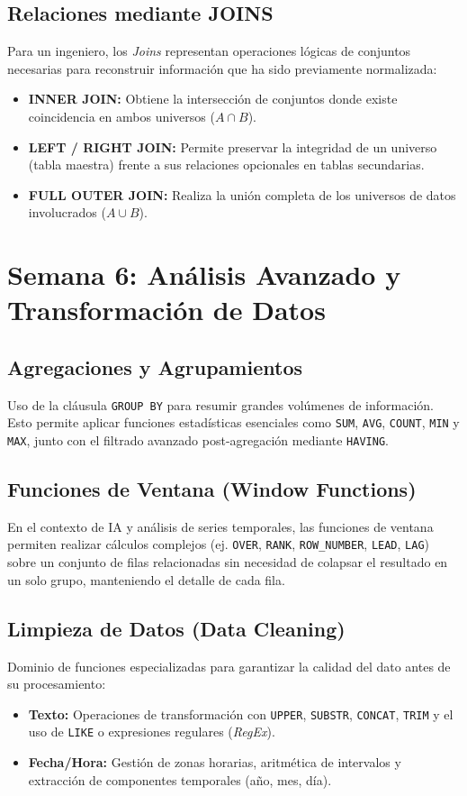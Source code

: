 \documentclass[12pt,a4paper,openany,oneside]{book}
\begin{document}
\subsection{Relaciones mediante JOINS}
Para un ingeniero, los \textit{Joins} representan operaciones lógicas de conjuntos necesarias para reconstruir información que ha sido previamente normalizada:
\begin{itemize}
    \item \textbf{INNER JOIN:} Obtiene la intersección de conjuntos donde existe coincidencia en ambos universos ($A \cap B$).
    \item \textbf{LEFT / RIGHT JOIN:} Permite preservar la integridad de un universo (tabla maestra) frente a sus relaciones opcionales en tablas secundarias.
    \item \textbf{FULL OUTER JOIN:} Realiza la unión completa de los universos de datos involucrados ($A \cup B$).
\end{itemize}



\section{Semana 6: Análisis Avanzado y Transformación de Datos}

\subsection{Agregaciones y Agrupamientos}
Uso de la cláusula \texttt{GROUP BY} para resumir grandes volúmenes de información. Esto permite aplicar funciones estadísticas esenciales como \texttt{SUM}, \texttt{AVG}, \texttt{COUNT}, \texttt{MIN} y \texttt{MAX}, junto con el filtrado avanzado post-agregación mediante \texttt{HAVING}.

\subsection{Funciones de Ventana (Window Functions)}
En el contexto de IA y análisis de series temporales, las funciones de ventana permiten realizar cálculos complejos (ej. \texttt{OVER}, \texttt{RANK}, \texttt{ROW\_NUMBER}, \texttt{LEAD}, \texttt{LAG}) sobre un conjunto de filas relacionadas sin necesidad de colapsar el resultado en un solo grupo, manteniendo el detalle de cada fila.

\subsection{Limpieza de Datos (Data Cleaning)}
Dominio de funciones especializadas para garantizar la calidad del dato antes de su procesamiento:
\begin{itemize}
    \item \textbf{Texto:} Operaciones de transformación con \texttt{UPPER}, \texttt{SUBSTR}, \texttt{CONCAT}, \texttt{TRIM} y el uso de \texttt{LIKE} o expresiones regulares (\textit{RegEx}).
    \item \textbf{Fecha/Hora:} Gestión de zonas horarias, aritmética de intervalos y extracción de componentes temporales (año, mes, día).
\end{itemize}
\end{document}
